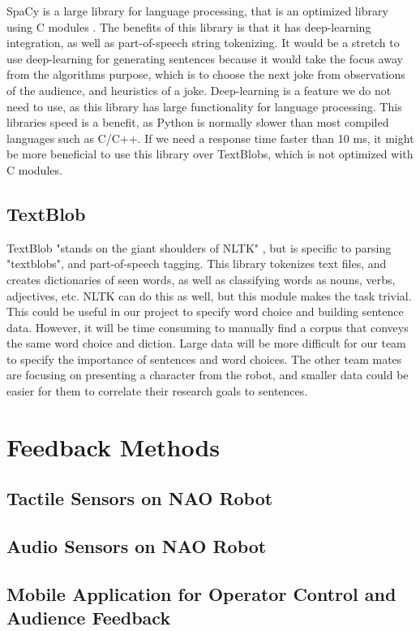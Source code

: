 \documentclass[onecolumn, draftclsnofoot,10pt, compsoc]{IEEEtran}
\begin{document}
  SpaCy is a large library for language processing, that is an optimized library using C modules \cite{spacy}. The benefits of this library is that it has deep-learning integration, as well as part-of-speech string tokenizing. It would be a stretch to use deep-learning for generating sentences because it would take the focus away from the algorithms purpose, which is to choose the next joke from observations of the audience, and heuristics of a joke. Deep-learning is a feature we do not need to use, as this library has large functionality for language processing. This libraries speed is a benefit, as Python is normally slower than most compiled languages such as C/C++. If we need a response time faster than 10 ms, it might be more beneficial to use this library over TextBlobs, which is not optimized with C modules.
  \subsection{TextBlob}

  TextBlob "stands on the giant shoulders of NLTK" \cite{textblob}, but is specific to parsing "textblobs", and part-of-speech tagging. This library tokenizes text files, and creates dictionaries of seen words, as well as classifying words as nouns, verbs, adjectives, etc. NLTK can do this as well, but this module makes the task trivial. This could be useful in our project to specify word choice and building sentence data. However, it will be time consuming to manually find a corpus that conveys the same word choice and diction. Large data will be more difficult for our team to specify the importance of sentences and word choices. The other team mates are focusing on presenting a character from the robot, and smaller data could be easier for them to correlate their research goals to sentences.

\section{Feedback Methods}
  \subsection{Tactile Sensors on NAO Robot}
  \subsection{Audio Sensors on NAO Robot}
  \subsection{Mobile Application for Operator Control and Audience Feedback}

\pagebreak




\end{document}
